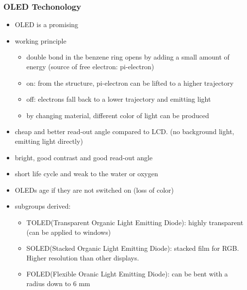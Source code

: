 \documentclass{standalone}
\begin{document}
\subsubsection*{OLED Techonology}
\begin{itemize}
\item OLED is a promising
\item working principle
	\begin{itemize}
		\item double bond in the benzene ring opens by adding a small amount of energy (source of free electron: pi-electron)
		\item on: from the structure, pi-electron can be lifted to a higher trajectory 
		\item off: electrons fall back to a lower trajectory and emitting light
		\item by changing material, different color of light can be produced
	\end{itemize}
\item cheap and better read-out angle compared to LCD. (no background light, emitting light directly)
\item bright, good contrast and good read-out angle
\item short life cycle and weak to the water or oxygen
\item OLEDs age if they are not switched on (loss of color)
\item subgroups derived:
	\begin{itemize}
		\item TOLED(Transparent Organic Light Emitting Diode): highly transparent (can be applied to windows)
		\item SOLED(Stacked Organic Light Emitting Diode): stacked film for RGB. Higher resolution than other displays.
		\item FOLED(Flexible Oranic Light Emitting Diode): can be bent with a radius down to 6 mm 
	\end{itemize}
\end{itemize}
\end{document}
